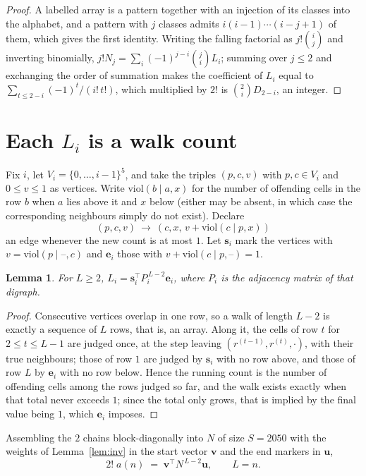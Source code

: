 \documentclass[11pt,a4paper]{article}
\theoremstyle{plain}
\newtheorem{lemma}[theorem]{Lemma}
\theoremstyle{definition}
\begin{document}
\begin{proof}
A labelled array is a pattern together with an injection of its classes into the alphabet,
and a pattern with $j$ classes admits $i(i-1)\cdots(i-j+1)$ of them, which gives the first
identity. Writing the falling factorial as $j!\binom{i}{j}$ and inverting binomially,
$j!N_j=\sum_i(-1)^{j-i}\binom{j}{i}L_i$; summing over $j\le2$ and exchanging the
order of summation makes the coefficient of $L_i$ equal to
$\sum_{t\le2-i}(-1)^t/(i!\,t!)$, which multiplied by $2!$ is
$\binom{2}{i}D_{2-i}$, an integer.
\end{proof}

\section{Each $L_i$ is a walk count}

Fix $i$, let $V_i=\{0,\dots,i-1\}^{5}$, and take the triples $(p,c,v)$ with
$p,c\in V_i$ and $0\le v\le1$ as vertices. Write $\mathrm{viol}(b\mid a,x)$ for the number
of offending cells in the row $b$ when $a$ lies above it and $x$ below (either may be
absent, in which case the corresponding neighbours simply do not exist). Declare
\[
(p,c,v)\ \longrightarrow\ (c,x,\,v+\mathrm{viol}(c\mid p,x))
\]
an edge whenever the new count is at most $1$. Let $\mathbf{s}_i$ mark the vertices with
$v=\mathrm{viol}(p\mid\text{--},c)$ and $\mathbf{e}_i$ those with
$v+\mathrm{viol}(c\mid p,\text{--})=1$.

\begin{lemma}\label{lem:walk}
For $L\ge2$, $L_i=\mathbf{s}_i^{\!\top}P_i^{\,L-2}\mathbf{e}_i$, where $P_i$ is the
adjacency matrix of that digraph.
\end{lemma}

\begin{proof}
Consecutive vertices overlap in one row, so a walk of length $L-2$ is exactly a sequence
of $L$ rows, that is, an array. Along it, the cells of row $t$ for $2\le t\le L-1$ are
judged once, at the step leaving $(r^{(t-1)},r^{(t)},\cdot)$, with their true neighbours;
those of row $1$ are judged by $\mathbf{s}_i$ with no row above, and those of row
$L$ by $\mathbf{e}_i$ with no row below. Hence the running count is the number of
offending cells among the rows judged so far, and the walk exists exactly when that total
never exceeds $1$; since the total only grows, that is implied by the final value being
$1$, which $\mathbf{e}_i$ imposes.
\end{proof}

Assembling the $2$ chains block-diagonally into $N$ of size $S=2050$ with the weights of
Lemma~\ref{lem:inv} in the start vector $\mathbf{v}$ and the end markers in
$\mathbf{u}$,
\begin{equation}\label{eq:walk2}
2!\;a(n)\;=\;\mathbf{v}^{\!\top}N^{\,L-2}\mathbf{u},\qquad L=n .
\end{equation}
\end{document}
